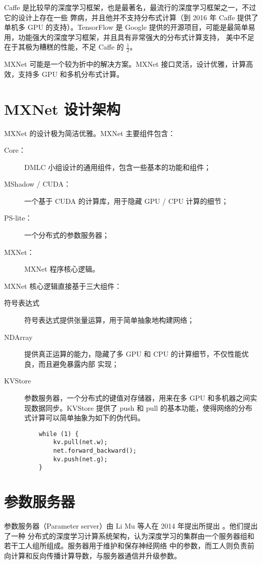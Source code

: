 \documentclass{ctexart}
\begin{document}
Caffe 是比较早的深度学习框架，也是最著名，最流行的深度学习框架之一，不过它的设计上存在一些
弊病，并且他并不支持分布式计算（到 2016 年 Caffe 提供了单机多 GPU 的支持）。TensorFlow 是 Google
提供的开源项目，可能是最简单易用，功能强大的深度学习框架，并且具有非常强大的分布式计算支持，
美中不足在于其极为糟糕的性能，不足 Caffe 的 $\frac 1 2$。

MXNet 可能是一个较为折中的解决方案。MXNet 接口灵活，设计优雅，计算高效，支持多 GPU 和多机分布式计算。

\section{MXNet 设计架构}

MXNet 的设计极为简洁优雅。MXNet 主要组件包含：

\begin{description}
	\item [Core：] DMLC 小组设计的通用组件，包含一些基本的功能和组件；
	\item [MShadow / CUDA：] 一个基于 CUDA 的计算库，用于隐藏 GPU / CPU 计算的细节；
	\item [PS-lite：] 一个分布式的参数服务器；
	\item [MXNet：] MXNet 程序核心逻辑。
\end{description}

MXNet 核心逻辑直接基于三大组件：

\begin{description}
	\item [符号表达式] 符号表达式提供张量运算，用于简单抽象地构建网络；
	\item [NDArray] 提供真正运算的能力，隐藏了多 GPU 和 CPU 的计算细节，不仅性能优良，而且避免暴露内部
	实现；
	\item [KVStore] 参数服务器，一个分布式的键值对存储器，用来在多 GPU 和多机器之间实现数据同步。KVStore
	提供了 push 和 pull 的基本功能，使得网络的分布式计算可以简单抽象为如下的伪代码。
	\begin{lstlisting}
	while (1) {
		kv.pull(net.w);
		net.forward_backward();
		kv.push(net.g);
	}
	\end{lstlisting}
\end{description}

\section{参数服务器}

参数服务器（Parameter server）由 Li Mu 等人在 2014 年提出所提出 \cite{communication} \cite{scaling} 。他们提出了一种
分布式的深度学习计算系统架构，认为深度学习的集群由一个服务器组和若干工人组所组成。服务器用于维护和保存神经网络
中的参数，而工人则负责前向计算和反向传播计算导数，与服务器通信并升级参数。
\end{document}
